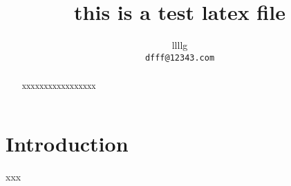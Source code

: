 \documentclass{article}
\title{this is a test latex file}
\author{llllg  \\
	\texttt{dfff@12343.com} \\
}
\begin{document}
\maketitle

\begin{abstract}
	xxxxxxxxxxxxxxxxx 
\end{abstract}
%
\section{Introduction}
\label{sec:introduction}
xxx \citep{Wang2005TE}

%

%

\newpage
\appendix
 
%
\end{document}
